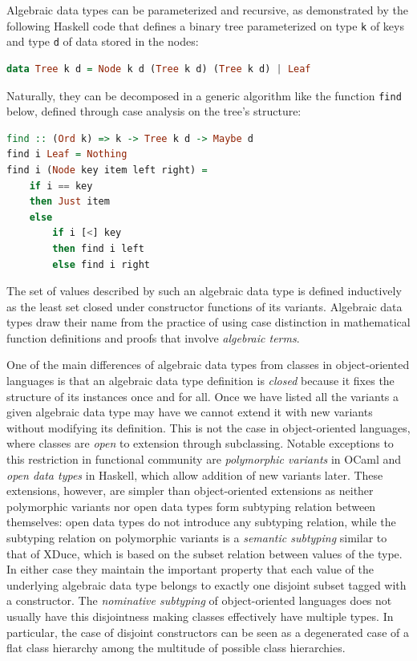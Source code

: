 \documentclass[preprint]{sigplanconf}
\makeatletter
\DeclareRobustCommand{\code}[1]{{\lstinline[breaklines=false,escapechar=@]{#1}}}
\DeclareRobustCommand{\codehaskell}[1]{{\lstinline[breaklines=false,language=Haskell]{#1}}}
\makeatother
\begin{document}
Algebraic data types can be parameterized and recursive, as demonstrated by the 
following Haskell code that defines a binary tree parameterized on type 
\codehaskell{k} of keys and type \codehaskell{d} of data stored in the nodes:

\begin{lstlisting}[language=Haskell]
data Tree k d = Node k d (Tree k d) (Tree k d) | Leaf
\end{lstlisting}

\noindent
Naturally, they can be decomposed in a generic algorithm like the function 
\code{find} below, defined through case analysis on the tree's structure:

\begin{lstlisting}[language=Haskell]
find :: (Ord k) => k -> Tree k d -> Maybe d
find i Leaf = Nothing
find i (Node key item left right) = 
    if i == key 
    then Just item 
    else 
        if i [<] key 
        then find i left 
        else find i right
\end{lstlisting}

\noindent
The set of values described by such an algebraic data type is defined 
inductively as the least set closed under constructor functions of its variants.
Algebraic data types draw their name from the practice of using case distinction 
in mathematical function definitions and proofs that involve \emph{algebraic 
terms}.

One of the main differences of algebraic data types from classes in 
object-oriented languages is that an algebraic data type definition is 
\emph{closed} because it fixes the structure of its instances once and for all. 
Once we have listed all the variants a given algebraic data type may have we 
cannot extend it with new variants without modifying its definition. This is not 
the case in object-oriented languages, where classes are \emph{open} to 
extension through subclassing. Notable exceptions to this restriction in 
functional community are \emph{polymorphic variants} in OCaml\cite{garrigue-98} 
and \emph{open data types} in Haskell\cite{LohHinze2006}, which allow addition 
of new variants later. These extensions, however, are simpler than object-oriented 
extensions as neither polymorphic variants nor open data types form subtyping 
relation between themselves: open data types do not introduce any subtyping 
relation, while the subtyping relation on polymorphic variants is a 
\emph{semantic subtyping} similar to that of XDuce\cite{HosoyaPierce2000}, which 
is based on the subset relation between values of the type. In either case they 
maintain the important property that each value of the underlying algebraic data 
type belongs to exactly one disjoint subset tagged with a constructor. The 
\emph{nominative subtyping} of object-oriented languages does not usually have 
this disjointness making classes effectively have multiple types. In particular, 
the case of disjoint constructors can be seen as a degenerated case of a flat 
class hierarchy among the multitude of possible class hierarchies.
\end{document}
